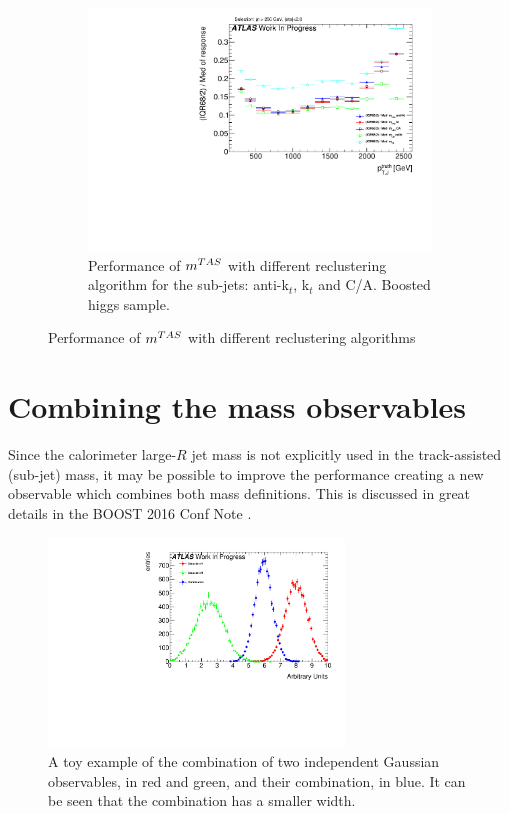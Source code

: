 \begin{figure}
\begin{subfigure}[b]{0.45\textwidth}
    \label{fig:allalgotop}
    \end{subfigure}
    \begin{subfigure}[b]{0.45\textwidth}
        \centering
   \includegraphics[width=\textwidth]{jet_part/mtas/71graphcftr_h_JetRatio_mJ12CALOIQRoMHiggsNOCalib.pdf}
    \caption{Performance of $m^{TAS}$ with different reclustering algorithm for the sub-jets: anti-k$_t$, k$_t$ and C/A. Boosted higgs sample.}
    \label{fig:allalgohiggs}
    \end{subfigure}
\caption{Performance of $m^{TAS}$ with different reclustering algorithms}
\end{figure}


\section{Combining the mass observables}


Since the calorimeter large-$R$ jet mass is not explicitly used in the track-assisted (sub-jet) mass, it may be possible to improve the performance creating a new observable which combines both mass definitions.
This is discussed in great details in the BOOST 2016 Conf Note \cite{art35}.


\begin{figure}[!ht]
  \centering
      \includegraphics[width=0.7\textwidth]{jet_part/mcomb/example.pdf}
  \caption[Toy example of Gaussian combination]{A toy example of the combination of two independent Gaussian observables, in red and green, and their combination, in blue. It can be seen that the combination has a smaller width.}
  \label{fig:mcomb1}
\end{figure}

